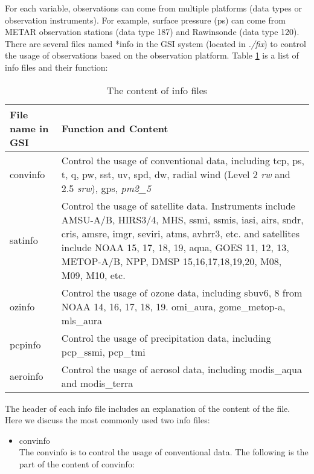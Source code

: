 \begin{enumerate}[leftmargin=*]
For each variable, observations can come from multiple platforms (data types or observation instruments). For example, surface pressure (ps) can come from METAR observation stations (data type 187) and Rawinsonde (data type 120). There are several files named *info in the GSI system (located in \textit{./fix}) to control the usage of observations based on the observation platform. Table \ref{tab42} is a list of info files and their function:
\begin{table}[htbp]
\centering
\caption{The content of info files }
\begin{tabular}{|p{2cm}|p{14cm}|}
\hline
\hline
File name in GSI & Function and Content \\
\hline
convinfo & Control the usage of conventional data, including tcp, ps, t, q, pw, sst, uv, spd, dw, radial wind (Level 2 \textit{rw} and 2.5 \textit{srw}), gps, \textit{pm2\_5} \\
\hline
satinfo	 & Control the usage of satellite data. Instruments include AMSU-A/B, HIRS3/4, MHS, ssmi, ssmis, iasi, airs, sndr, cris, amsre, imgr, seviri, atms, avhrr3, etc. and satellites include NOAA 15, 17, 18, 19, aqua, GOES 11, 12, 13, METOP-A/B, NPP, DMSP 15,16,17,18,19,20, 
M08, M09, M10, etc.\\
ozinfo & Control the usage of ozone data, including sbuv6, 8 from NOAA 14, 16, 17, 18, 19. omi\_aura, gome\_metop-a, mls\_aura \\
\hline
pcpinfo	& Control the usage of precipitation data, including pcp\_ssmi, pcp\_tmi \\
\hline
aeroinfo & Control the usage of aerosol data, including modis\_aqua and modis\_terra \\
\hline
\end{tabular}
\label{tab42}
\end{table} 

The header of each info file includes an explanation of the content of the file. Here we discuss the most commonly used two info files:

\begin{itemize}[leftmargin=*]
\item convinfo\\

The convinfo is to control the usage of conventional data. The following is the part of the content of convinfo:

\begin{tiny}
\begin{verbatim}


\end{verbatim}
\end{tiny}
\end{itemize}
\end{enumerate}
